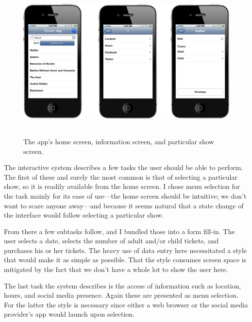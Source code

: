 \documentclass{abrice}
\begin{document}
\begin{figure}
  \caption{The app's home screen, information screen, and particular show
    screen.}
  \includegraphics[height=8cm]{phones}
\end{figure}

\noindent
The interactive system describes a few tasks the user should be able to
perform. The first of these and surely the most common is that of selecting a
particular show, so it is readily available from the home screen. I chose menu
selection for the task mainly for its ease of use---the home screen should be
intuitive; we don't want to scare anyone away---and because it seems natural
that a state change of the interface would follow selecting a particular show.

From there a few subtasks follow, and I bundled those into a form fill-in. The
user selects a date, selects the number of adult and/or child tickets, and
purchases his or her tickets. The heavy use of data entry here necessitated a
style that would make it as simple as possible. That the style consumes screen
space is mitigated by the fact that we don't have a whole lot to show the user
here.

The last task the system describes is the access of information such as
location, hours, and social media presence. Again these are presented as menu
selection. For the latter the style is necessary since either a web browser or
the social media provider's app would launch upon selection.
\end{document}
